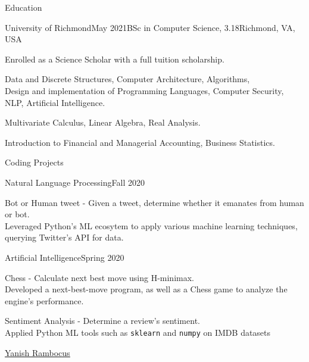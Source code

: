 \documentclass{resume} %
\begin{document}
\begin{rSection}{Education}
    \capsdef{////}{\scshape}{0.1pt}{2.5pt}{1pt}
    \begin{rSubsection}{University of Richmond}{May 2021}{BSc in Computer Science, \large{} 3.18}{Richmond, VA, USA}
    \item  Enrolled as a Science Scholar with a full tuition scholarship.
    \item {} Data and Discrete Structures, Computer Architecture, Algorithms,\\
        Design and implementation of Programming Languages, Computer Security, NLP, Artificial Intelligence.
    \item {} Multivariate Calculus, Linear Algebra, Real Analysis.
    \item {} Introduction to Financial and Managerial Accounting, Business Statistics.
    \end{rSubsection}

\end{rSection}

\begin{rSection}{Coding Projects}
    \begin{rSubsection}{Natural Language Processing}{Fall 2020}{}{}
        \item Bot or Human tweet - Given a tweet, determine whether it emanates from human or bot.\\
           Leveraged Python's ML ecosytem to apply various machine learning techniques,
           querying Twitter's API for data.

    \end{rSubsection}

    \begin{rSubsection}{Artificial Intelligence}{Spring 2020}{}{}
        \item Chess - Calculate next best move using H-minimax. \\
            Developed a next-best-move program, as well as a Chess game to analyze the engine's performance.
        \item Sentiment Analysis - Determine a review's sentiment.\\
            Applied Python ML tools such as \texttt{sklearn} and \texttt{numpy} on IMDB datasets
    \end{rSubsection}

\end{rSection}

\vspace{1.4em}

\small  
\noindent
\faLinkedin \hspace{0.2em} \href{https://linkedin.com/in/yanish-rambocus-4a46b7155/}{\underline{Yanish Rambocus}}
\hspace{431pt}
\end{document}

